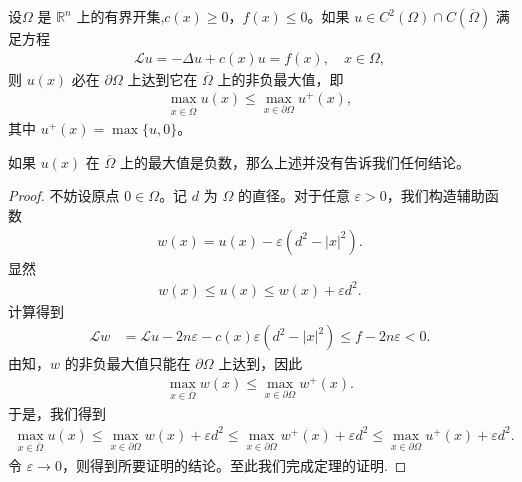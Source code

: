 \documentclass[../../main.tex]{subfiles}%
\begin{document}
\begin{theorem}\label{theorem:Lu方程极值原理}
设$\Omega$ 是 $\mathbb{R}^n$ 上的有界开集,$c(x)\geqslant 0$，$f(x)\leqslant 0$。如果 $u\in C^2(\Omega)\cap C(\overline{\Omega})$ 满足方程
\begin{align*}
\mathcal{L}u = -\Delta u + c(x)u = f(x), \quad x\in\Omega,
\end{align*}
则 $u(x)$ 必在 $\partial\Omega$ 上达到它在 $\overline{\Omega}$ 上的非负最大值，即
\begin{align*}
\max_{x\in\overline{\Omega}} u(x) \leqslant \max_{x\in\partial\Omega} u^+(x),
\end{align*}
其中 $u^+(x)=\max\{u,0\}$。
\end{theorem}
\begin{remark}
如果 $u(x)$ 在 $\overline{\Omega}$ 上的最大值是负数，那么上述并没有告诉我们任何结论。
\end{remark}
\begin{proof}
不妨设原点 $0\in\Omega$。记 $d$ 为 $\Omega$ 的直径。对于任意 $\varepsilon>0$，我们构造辅助函数
\begin{align*}
w(x) = u(x) - \varepsilon(d^2 - |x|^2).
\end{align*}
显然
\begin{align*}
w(x) \leqslant u(x) \leqslant w(x) + \varepsilon d^2.
\end{align*}
计算得到
\begin{align*}
\mathcal{L}w &= \mathcal{L}u - 2n\varepsilon - c(x)\varepsilon(d^2 - |x|^2) \leqslant f - 2n\varepsilon < 0.
\end{align*}
由知，$w$ 的非负最大值只能在 $\partial\Omega$ 上达到，因此
\begin{align*}
\max_{x\in\overline{\Omega}} w(x) \leqslant \max_{x\in\partial\Omega} w^+(x).
\end{align*}
于是，我们得到
\begin{align*}
\max_{x\in\overline{\Omega}} u(x)\leqslant \max_{x\in\partial\Omega} w(x) + \varepsilon d^2 \leqslant \max_{x\in\partial\Omega} w^+(x) + \varepsilon d^2 \leqslant \max_{x\in\partial\Omega} u^+(x) + \varepsilon d^2.
\end{align*}
令 $\varepsilon\to 0$，则得到所要证明的结论。至此我们完成定理的证明.
\end{proof}
\end{document}
